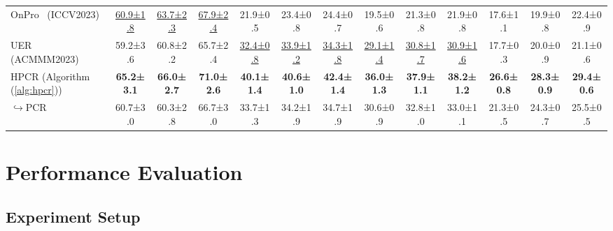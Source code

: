 \begin{table}[t]
\begin{tabular}{l|ccc|ccc|ccc|ccc}
OnPro~\cite{wei2023online} (ICCV2023)   & \underline{60.9\scriptsize±1.8}  & \underline{63.7\scriptsize±2.3}  & \underline{67.9\scriptsize±2.4}                 & 21.9\scriptsize±0.5  & 23.4\scriptsize±0.8  & 24.4\scriptsize±0.7 & 19.5\scriptsize±0.6  & 21.3\scriptsize±0.8  & 21.9\scriptsize±0.8 & 17.6\scriptsize±1.1                   & 19.9\scriptsize±0.8                  & 22.4\scriptsize±0.9\\
UER~\cite{lin2023uer} (ACMMM2023)   & {59.2\scriptsize±3.6}  & {60.8\scriptsize±2.2}  & {65.7\scriptsize±2.4}                 & \underline{32.4\scriptsize±0.8}  & \underline{33.9\scriptsize±1.2}  & \underline{34.3\scriptsize±1.8} & \underline{29.1\scriptsize±1.4}  & \underline{30.8\scriptsize±1.7}  & \underline{30.9\scriptsize±1.6} & 17.7\scriptsize±0.3                   & 20.0\scriptsize±0.9                  & 21.1\scriptsize±0.6\\
\hline
HPCR (Algorithm (\ref{alg:hpcr}))   & \textbf{65.2\scriptsize±3.1}& \textbf{66.0\scriptsize±2.7}                 & \textbf{71.0\scriptsize±2.6}                 & \textbf{40.1\scriptsize±1.4}                  & \textbf{40.6\scriptsize±1.0}                  & \textbf{42.4\scriptsize±1.4} & \textbf{36.0\scriptsize±1.3}                   & \textbf{37.9\scriptsize±1.1}                  & \textbf{38.2\scriptsize±1.2} & \textbf{26.6\scriptsize±0.8}                   & \textbf{28.3\scriptsize±0.9}                  & \textbf{29.4\scriptsize±0.6}\\
$\hookrightarrow$PCR   & 60.7\scriptsize±3.0& 60.3\scriptsize±2.8                 & 66.7\scriptsize±3.0                 & 33.7\scriptsize±1.3                  & 34.2\scriptsize±1.9                  & 34.7\scriptsize±1.9 & 30.6\scriptsize±0.9                   & 32.8\scriptsize±1.0                  & 33.0\scriptsize±1.1 & 21.3\scriptsize±0.5                   & 24.3\scriptsize±0.7                  & 25.5\scriptsize±0.5\\
\hline
\end{tabular}
\vspace{-4ex}
\end{table}





\section{Performance Evaluation}
\label{sec:experiments}
\subsection{Experiment Setup}
